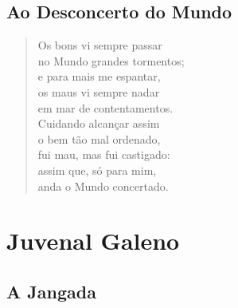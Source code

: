 \documentclass[10pt,a5paper,oneside]{book}
\begin{document}
\chapter{Ao Desconcerto do Mundo}

\begin{verse}
Os bons vi sempre passar\\
no Mundo grandes tormentos;\\
e para mais me espantar,\\
os maus vi sempre nadar\\
em mar de contentamentos.\\
Cuidando alcançar assim\\
o bem tão mal ordenado,\\
fui mau, mas fui castigado:\\
assim que, só para mim,\\
anda o Mundo concertado.
\end{verse}

\part{Juvenal Galeno}

\chapter{A Jangada}
\end{document}

